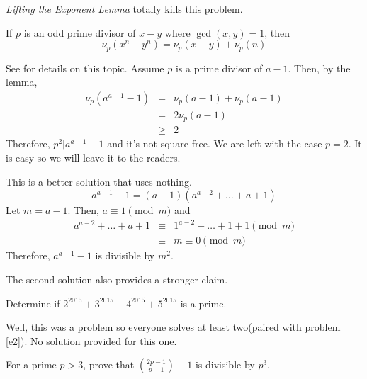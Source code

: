 \documentclass{subfile}
\begin{document}
		\begin{solution}[\bf First]
			\textit{Lifting the Exponent Lemma} totally kills this problem.
			
			\begin{lemma}
				If $p$ is an odd prime divisor of $x-y$ where $\gcd(x,y)=1$, then \[\nu_p(x^n-y^n)=\nu_p(x-y)+\nu_p(n)\]
			\end{lemma}
			
			See \cite{amir} for details on this topic. Assume $p$ is a prime divisor of $a-1$. Then, by the lemma,
			\begin{eqnarray*}
				\nu_p(a^{a-1}-1) & = & \nu_p(a-1)+\nu_p(a-1)\\
				& = & 2\nu_p(a-1)\\
				&\geq&2
			\end{eqnarray*}
			Therefore, $p^2|a^{a-1}-1$ and it's not square-free. We are left with the case $p=2$. It is easy so we will leave it to the readers.
		\end{solution}
		
		\begin{solution}[\bf Second]
			This is a better solution that uses nothing.
			\[a^{a-1}-1=(a-1)(a^{a-2}+\ldots+a+1)\]
			Let $m=a-1$. Then, $a\equiv1\pmod m$ and
			\begin{eqnarray*}
				a^{a-2}+\ldots+a+1  &\equiv& 1^{a-2}+\ldots+1+1\pmod m\\
				&\equiv&m\equiv0\pmod m
			\end{eqnarray*}
			Therefore, $a^{a-1}-1$ is divisible by $m^2$.
		\end{solution}
		
		\begin{note}
			The second solution also provides a stronger claim.
		\end{note}
		
		\begin{problem}
			Determine if $2^{2015}+3^{2015}+4^{2015}+5^{2015}$ is a prime.
		\end{problem}
		
		\begin{solution}
			Well, this was a problem so everyone solves at least two(paired with problem \eqref{e2}). No solution provided for this one.
		\end{solution}
		
		\begin{problem}
			For a prime $p>3$, prove that $\binom{2p-1}{p-1}-1$ is divisible by $p^3$.
		\end{problem}
		
\end{document}
